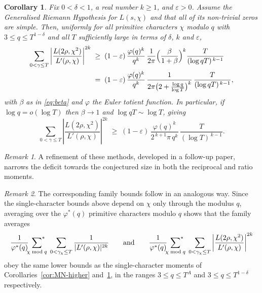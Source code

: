 \documentclass[12pt,a4paper,reqno]{amsart}
\newtheorem{corollary}[theorem]{Corollary}
\theoremstyle{remark}
\newtheorem*{remark}{Remark}
\numberwithin{equation}{section}
\begin{document}
\begin{corollary}\label{cor:Ng-higher}
Fix $0<\delta<1$, a real number $k\ge1$, and $\varepsilon>0$. Assume the
Generalised Riemann Hypothesis for $L(s,\chi)$ and that all of its non-trivial
zeros are simple. Then, uniformly for all primitive characters $\chi$ modulo $q$
with $3\le q\le T^{1-\delta}$ and all $T$ sufficiently large in terms of $\delta$,
$k$ and $\varepsilon$,
\begin{align*}
      \sum_{0<\gamma\le T}\left|\frac{L(2\rho,\chi^2)}{L'(\rho,\chi)}\right|^{2k}
  \;&\ge\;(1-\varepsilon)\,\frac{\varphi(q)^{k}}{q^{k}}\,\frac{1}{2\pi}
  \Bigl(\frac{\beta}{1+\beta}\Bigr)^{k}\frac{T}{(\log qT)^{\,k-1}} \\
  &=\;(1-\varepsilon)\,\frac{\varphi(q)^{k}}{q^{k}}\,
  \frac{1}{2\pi\bigl(2+\frac{\log q}{\log T}\bigr)^{k}}\,\frac{T}{(\log qT)^{\,k-1}},
\end{align*}
with $\beta$ as in \eqref{eq:beta} and $\varphi$ the Euler totient function. In
particular, if $\log q=o(\log T)$ then $\beta\to1$ and $\log qT\sim\log T$, giving
\[
  \sum_{0<\gamma\le T}\left|\frac{L(2\rho,\chi^2)}{L'(\rho,\chi)}\right|^{2k}
  \;\ge\;(1-\varepsilon)\,\frac{\varphi(q)^{k}}{2^{\,k+1}\pi\,q^{k}}\,
  \frac{T}{(\log T)^{\,k-1}} .
\]
\end{corollary}

\begin{remark}
A refinement of these methods, developed in a follow-up paper, narrows the deficit towards the conjectured size in both the reciprocal and ratio moments.
\end{remark}

\begin{remark}
The corresponding family bounds follow in an analogous way. Since the single-character bounds above depend on $\chi$ only through the modulus $q$, averaging over the $\varphi^*(q)$ primitive characters modulo $q$ shows that the family averages
\[
\frac{1}{\varphi^*(q)}\sideset{}{^*}\sum_{\chi\bmod q}\;\sum_{0<\gamma_\chi\le T}\frac{1}{|L'(\rho,\chi)|^{2k}}
\qquad\text{and}\qquad
\frac{1}{\varphi^*(q)}\sideset{}{^*}\sum_{\chi\bmod q}\;\sum_{0<\gamma_\chi\le T}\left|\frac{L(2\rho,\chi^2)}{L'(\rho,\chi)}\right|^{2k}
\]
obey the same lower bounds as the single-character moments of Corollaries~\ref{cor:MN-higher} and~\ref{cor:Ng-higher}, in the ranges $3\le q\le T^{A}$ and $3\le q\le T^{1-\delta}$ respectively.
\end{remark}
\end{document}
